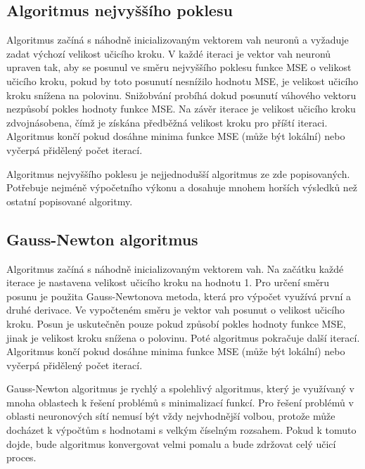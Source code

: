 \documentclass[11pt,twoside,a4paper]{book}
\begin{document}
\subsection{Algoritmus nejvyššího poklesu}
Algoritmus začíná s náhodně inicializovaným vektorem vah neuronů a vyžaduje zadat výchozí velikost učicího kroku. V každé iteraci je vektor vah neuronů upraven tak, aby se posunul ve směru nejvyššího poklesu funkce MSE o velikost učicího kroku, pokud by toto posunutí nesnížilo hodnotu MSE, je velikost učicího kroku snížena na polovinu. Snižobvání probíhá dokud posunutí váhového vektoru nezpůsobí pokles hodnoty funkce MSE.  Na závěr iterace je velikost učicího kroku zdvojnásobena, čímž je získána předběžná velikost kroku pro příští iteraci. Algoritmus končí pokud dosáhne minima funkce MSE (může být lokální) nebo vyčerpá přidělený počet iterací.

Algoritmus nejvyššího poklesu je nejjednodušší algoritmus ze zde popisovaných. Potřebuje nejméně výpočetního výkonu a dosahuje mnohem horších výsledků než ostatní popisované algoritmy.\cite{nndocumentation}
\subsection{Gauss-Newton algoritmus}
Algoritmus začíná s náhodně inicializovaným vektorem vah. Na začátku každé iterace je nastavena velikost učicího kroku na hodnotu 1. Pro určení směru posunu je použita Gauss-Newtonova metoda, která pro výpočet využívá první a druhé derivace. Ve vypočteném směru je vektor vah posunut o velikost učicího kroku. Posun je uskutečněn pouze pokud způsobí pokles hodnoty funkce MSE, jinak je velikost kroku snížena o polovinu. Poté algoritmus pokračuje další iterací. Algoritmus končí pokud dosáhne minima funkce MSE (může být lokální) nebo vyčerpá přidělený počet iterací.

Gauss-Newton algoritmus je rychlý a spolehlivý algoritmus, který je využívaný v mnoha oblastech k řešení problémů s minimalizací funkcí. Pro řešení problémů v oblasti neuronových sítí nemusí být vždy nejvhodnější volbou, protože může docházet k výpočtům s hodnotami s velkým číselným rozsahem. Pokud k tomuto dojde, bude algoritmus konvergovat velmi pomalu a bude zdržovat celý učicí proces. \cite{nndocumentation}
\end{document}
